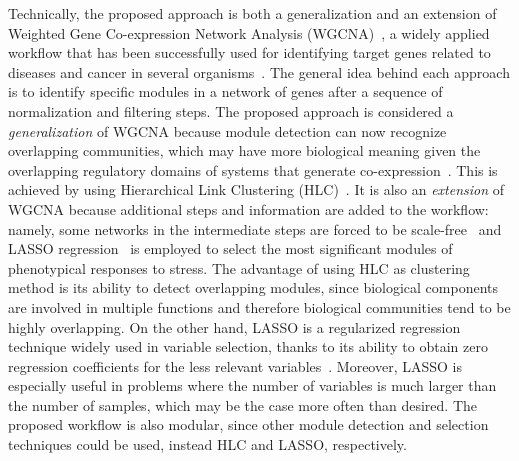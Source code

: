 Technically, the proposed approach is both a generalization and an
extension of Weighted Gene Co-expression Network Analysis
(WGCNA)~\cite{todo2}, a widely applied workflow that has been
successfully used for identifying target genes related to diseases and
cancer in several organisms~\cite{tian2018identifying}. The general
idea behind each approach is to identify specific modules in a network
of genes after a sequence of normalization and filtering steps. The
proposed approach is considered a \textit{generalization} of WGCNA
because module detection can now recognize overlapping communities,
which may have more biological meaning given the overlapping
regulatory domains of systems that generate
co-expression~\cite{gaiteri2014beyond}. This is achieved by using
Hierarchical Link Clustering (HLC)~\cite{ahn2010link}. It is also an
\textit{extension} of WGCNA because additional steps and information
are added to the workflow: namely, some networks in the intermediate
steps are forced to be scale-free~\cite{todo3} and LASSO
regression~\cite{tibshirani1996regression} is employed to select the
most significant modules of phenotypical responses to stress.  The
advantage of using HLC as clustering method is its ability to detect
overlapping modules, since biological components are involved in
multiple functions and therefore biological communities tend to be
highly overlapping. On the other hand, LASSO is a regularized
regression technique widely used in variable selection, thanks to its
ability to obtain zero regression coefficients for the less relevant
variables~\cite{desboulets2018review}. Moreover, LASSO is especially
useful in problems where the number of variables is much larger than
the number of samples, which may be the case more often than desired.
The proposed workflow is also modular, since other module detection
and selection techniques could be used, instead HLC and LASSO,
respectively.


